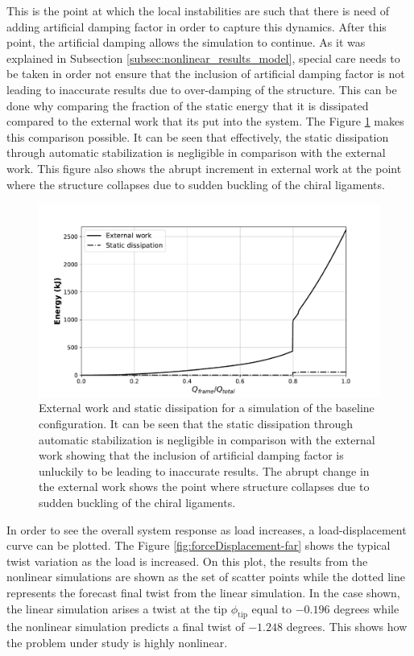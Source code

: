   This is the point at which the local instabilities are such that there is need of adding artificial damping factor in order to capture this dynamics. After this point, the artificial damping allows the simulation to continue. As it was explained in Subsection \ref{subsec:nonlinear_results_model}, special care needs to be taken in order not ensure that the inclusion of artificial damping factor is not leading to inaccurate results due to over-damping of the structure. This can be done why comparing the fraction of the static energy that it is dissipated compared to the external work that its put into the system. The Figure \ref{fig:energy} makes this comparison possible. It can be seen that effectively, the static dissipation through automatic stabilization is negligible in comparison with the external work. This figure also shows the abrupt increment in external work at the point where the structure collapses due to sudden buckling of the chiral ligaments.

  \begin{figure}[!htpb] %
    \centering
    \includegraphics[width=0.8 \textwidth]{../figures/result-sim/energy}
    \caption[External work and static dissipation for a simulation of the baseline configuration]{External work and static dissipation for a simulation of the baseline configuration. It can be seen that the static dissipation through automatic stabilization is negligible in comparison with the external work showing that the inclusion of artificial damping factor is unluckily to be leading to inaccurate results. The abrupt change in the external work shows the point where structure collapses due to sudden buckling of the chiral ligaments.}\label{fig:energy}
  \end{figure}

  In order to see the overall system response as load increases, a load-displacement curve can be plotted. The Figure \ref{fig:forceDisplacement-far} shows the typical twist variation as the load is increased. On this plot, the results from the nonlinear simulations are shown as the set of scatter points while the dotted line represents the forecast final twist from the linear simulation. In the case shown, the linear simulation arises a twist at the tip $\phi_{\mathrm{tip}}$ equal to $-0.196$ degrees while the nonlinear simulation predicts a final twist of $-1.248$ degrees. This shows how the problem under study is highly nonlinear.

